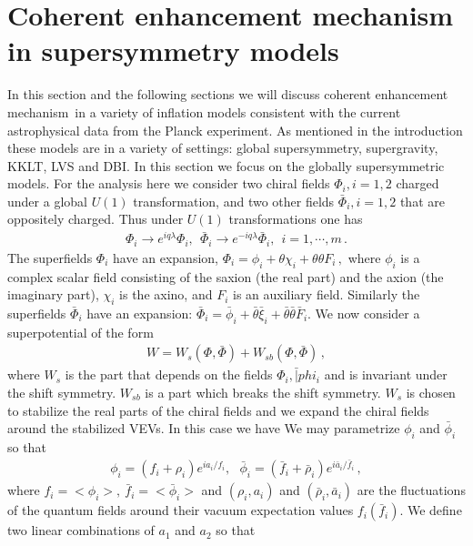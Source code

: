 \documentclass[12pt]{article}
\def\cem{coherent enhancement mechanism~}
\begin{document}
\section{Coherent enhancement mechanism in supersymmetry models}
In this section and the following sections we will discuss \cem in a variety of inflation models consistent with the current astrophysical data 
from the Planck experiment. As mentioned in the introduction these models are in a variety of settings:  global supersymmetry, supergravity,
KKLT, LVS and DBI. In this section we focus on the globally supersymmetric models.
For the analysis here we consider two chiral fields $\Phi_i, i=1,2$ charged under a global $U(1)$ 
transformation, and two other fields $\bar\Phi_i, i=1,2$ that are oppositely charged.
Thus under $U(1)$  transformations one
has
\begin{align}
\Phi_i\to e^{i q \lambda} \Phi_i, ~~\bar \Phi_i\to e^{-i q \lambda} \bar \Phi_i, ~~i=1, \cdots, m\,.
\end{align}
The superfields ${\Phi}_{i}$ have an expansion, 
${\Phi}_{i} = {\phi}_{i} + \theta  {\chi}_{i} + \theta  \theta  {F}_{i}\,,$
where ${\phi}_{i}$ is a complex scalar field consisting of the saxion (the real part) and the axion (the imaginary
part), ${\chi}_{i}$ is the axino, and ${F}_{i}$ is an auxiliary field.
Similarly the superfields $\bar {\Phi}_{i}$ have an expansion:
$\bar {\Phi}_{i} = \bar {\phi}_{i} + \bar \theta  \bar {\xi}_{i} + \bar\theta \bar  \theta  \bar{F}_{i}$.
We now consider a superpotential of the form 
\begin{align}
W = W_s(\Phi,\bar \Phi) + W_ {sb} (\Phi, \bar \Phi)\,,
\label{wsn}
\end{align}
where $W_s$ is the part that depends on the fields $\Phi_i,  \bar |phi_i$ and is invariant under the shift symmetry.
$W_{sb}$ is a  part which breaks the shift symmetry.  $W_s$ is chosen to stabilize the real parts of the chiral fields 
and we expand the chiral fields around the stabilized VEVs. In this case we have 
 We may parametrize $\phi_i$ and $\bar \phi_i$ so that 
\begin{align}
\phi_i = (f_i + \rho_i) e^{ia_i/f_i}, ~~~\bar\phi_i = (\bar f_i + \bar \rho_i) e^{i\bar a_i/\bar f_i}\,,
\end{align}
where $f_i= <\phi_i> ,~\bar f_i= <\bar\phi_i>$ and  $(\rho_i, a_i)$ and $(\bar \rho_i, \bar a_i)$ 
are the fluctuations of the quantum fields around their vacuum expectation values  $f_i(\bar f_i)$. 
 We define two linear combinations of $a_1$ and $a_2$ so that 
\end{document}

